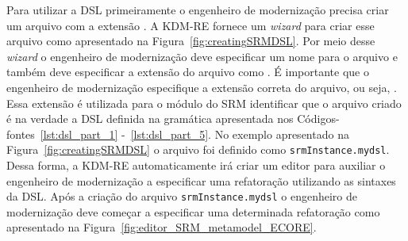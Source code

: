 


Para utilizar a DSL primeiramente o engenheiro de modernização precisa criar um arquivo com a extensão . A KDM-RE fornece um \textit{wizard} para criar esse arquivo como apresentado na Figura~\ref{fig:creatingSRMDSL}. Por meio desse \textit{wizard} o engenheiro de modernização deve especificar um nome para o arquivo e também deve especificar a extensão do arquivo como . É importante que o engenheiro de modernização especifique a extensão correta do arquivo, ou seja, . Essa extensão é utilizada para o módulo do SRM identificar que o arquivo criado é na verdade a DSL definida na gramática apresentada nos Códigos-fontes~\ref{lst:dsl_part_1} -~\ref{lst:dsl_part_5}. No exemplo apresentado na Figura~\ref{fig:creatingSRMDSL} o arquivo foi definido como \texttt{srmInstance.mydsl}. Dessa forma, a KDM-RE automaticamente irá criar um editor para auxiliar o engenheiro de modernização a especificar uma refatoração utilizando as sintaxes da DSL. Após a criação do arquivo \texttt{srmInstance.mydsl} o engenheiro de modernização deve começar a especificar uma determinada refatoração como apresentado na Figura~\ref{fig:editor_SRM_metamodel_ECORE}. 


